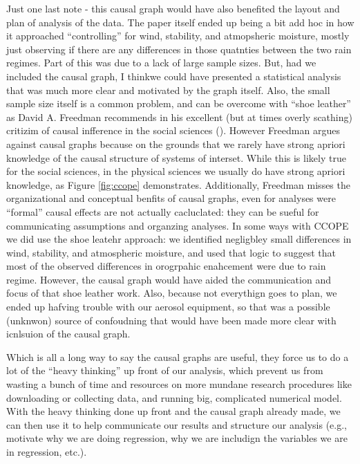 \documentclass[12pt]{article}
\begin{document}
Just one last note - this causal graph would have also benefited the
layout and plan of analysis of the data. The paper itself ended up
being a bit add hoc in how it approached ``controlling'' for wind,
stability, and atmopsheric moisture, mostly just observing if there
are any differences in those quatnties between the two rain
regimes. Part of this was due to a lack of large sample sizes. But,
had we included the causal graph, I thinkwe could have presented a
statistical analysis that was much more clear and motivated by the
graph itself. Also, the small sample size itself is a common problem,
and can be overcome with ``shoe leather'' as David A. Freedman
recommends in his excellent (but at times overly scathing) critizim of
causal infference in the social sciences
(\cite{freedman2010statistical}). However Freedman argues against
causal graphs because on the grounds that we rarely have strong
apriori knowledge of the causal structure of systems of
interset. While this is likely true for the social sciences, in the
physical sciences we usually do have strong apriori knowledge, as
Figure \ref{fig:ccope} demonstrates. Additionally, Freedman misses the
organizational and conceptual benfits of causal graphs, even for
analyses were ``formal'' causal effects are not actually cacluclated:
they can be sueful for communicating assumptions and organzing
analyses. In some ways with CCOPE we did use the shoe leatehr
approach: we identified negligbley small differences in wind,
stability, and atmospheric moisture, and used that logic to suggest
that most of the observed differences in orogrpahic enahcement were
due to rain regime. However, the causal graph would have aided the
communication and focus of that shoe leather work. Also, because not
everythign goes to plan, we ended up hafving trouble with our aerosol
equipment, so that was a possible (unknwon) source of confoudning that
would have been made more clear with icnlsuion of the causal graph.

Which is all a long way to say the causal graphs are useful, they
force us to do a lot of the ``heavy thinking'' up front of our
analysis, which prevent us from wasting a bunch of time and resources
on more mundane research procedures like downloading or collecting
data, and running big, complicated numerical model. With the heavy
thinking done up front and the causal graph already made, we can then
use it to help communicate our results and structure our analysis
(e.g., motivate why we are doing regression, why we are includign the
variables we are in regression, etc.).
\end{document}
